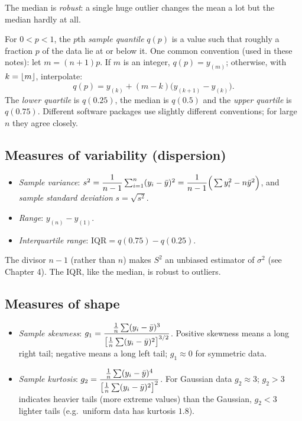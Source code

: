 The median is \emph{robust}: a single huge outlier changes the mean a lot but the median
hardly at all.

\begin{definition}
For $0<p<1$, the $p$th \emph{sample quantile} $q(p)$ is a value such that roughly a
fraction $p$ of the data lie at or below it. One common convention (used in these notes):
let $m = (n+1)p$. If $m$ is an integer, $q(p) = y_{(m)}$; otherwise, with
$k=\left\lfloor m \right\rfloor$, interpolate:
\[
q(p) = y_{(k)} + (m-k)\big(y_{(k+1)} - y_{(k)}\big).
\]
The \emph{lower quartile} is $q(0.25)$, the median is $q(0.5)$ and the \emph{upper
quartile} is $q(0.75)$. Different software packages use slightly different conventions;
for large $n$ they agree closely.
\end{definition}

\subsection{Measures of variability (dispersion)}

\begin{definition}
\begin{itemize}
  \item \emph{Sample variance}: $s^2 = \dfrac{1}{n-1}\sum_{i=1}^n (y_i-\bar{y})^2
        = \dfrac{1}{n-1}\Big(\sum y_i^2 - n\bar{y}^2\Big)$, and \emph{sample standard
        deviation} $s=\sqrt{s^2}$.
  \item \emph{Range}: $y_{(n)} - y_{(1)}$.
  \item \emph{Interquartile range}: $\mathrm{IQR} = q(0.75) - q(0.25)$.
\end{itemize}
\end{definition}

The divisor $n-1$ (rather than $n$) makes $S^2$ an unbiased estimator of $\sigma^2$
(see Chapter 4). The IQR, like the median, is robust to outliers.

\subsection{Measures of shape}

\begin{definition}
\begin{itemize}
  \item \emph{Sample skewness}:
  $\displaystyle g_1 = \frac{\frac1n\sum (y_i-\bar{y})^3}{\big[\frac1n\sum (y_i-\bar{y})^2\big]^{3/2}}$.
  Positive skewness means a long right tail; negative means a long left tail; $g_1\approx
  0$ for symmetric data.
  \item \emph{Sample kurtosis}:
  $\displaystyle g_2 = \frac{\frac1n\sum (y_i-\bar{y})^4}{\big[\frac1n\sum (y_i-\bar{y})^2\big]^{2}}$.
  For Gaussian data $g_2 \approx 3$; $g_2>3$ indicates heavier tails (more extreme
  values) than the Gaussian, $g_2<3$ lighter tails (e.g.\ uniform data has kurtosis
  $1.8$).
\end{itemize}
\end{definition}


